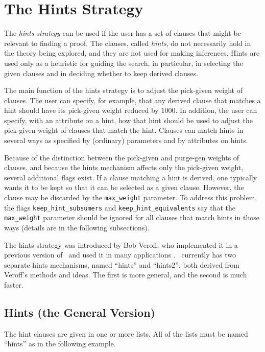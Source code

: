 \documentclass[11pt]{article}
\begin{document}
\section{The Hints Strategy} \label{hints}

The \emph{hints strategy} can be used if the user has a set of
clauses that might be relevant to finding a proof.
The clauses, called \emph{hints}, do not necessarily hold
in the theory being explored, and they are not used for making inferences.
Hints are used only as a heuristic for guiding the search, in particular,
in selecting the given clauses and in deciding whether to keep
derived clauses.

The main function of the hints strategy is to adjust the pick-given
weight of clauses.  The user can specify, for example, that any derived
clause that matches a hint should have its pick-given weight reduced
by 1000.  In addition, the user can specify, with an attribute on a hint,
how that hint should be used to adjust the pick-given weight of
clauses that match the hint.  Clauses can match hints in several
ways as specified by (ordinary) parameters and by attributes on hints.

Because of the distinction between the pick-given and purge-gen
weights of clauses, and because the hints mechanism affects only
the pick-given weight, several additional flags exist.  If a clause
matching a hint is derived, one typically wants it to be kept so
that it can be selected as a given clause.  However, the clause
may be discarded by the \verb:max_weight: parameter.
To address this problem, the flags
\verb:keep_hint_subsumers: and \verb:keep_hint_equivalents: say
that the \verb:max_weight: parameter should be ignored for
all clauses that match hints in those ways (details are
in the following subsections).

The hints strategy was introduced by Bob Veroff, who implemented
it in a previous version of \otter\ and used it in many applications
\cite{veroff:hints,veroff:sketches}.
\otter\ currently has two separate
hints mechanisms, named ``hints'' and ``hints2'',
both derived from Veroff's methods and ideas.  The first is more
general, and the second is much faster.

\subsection{Hints (the General Version)}

The hint clauses are given in one or more lists.  All of the
lists must be named ``hints'' as in the following example.
\end{document}
